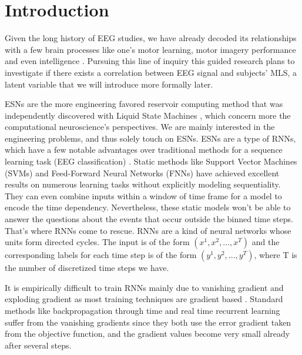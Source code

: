 \documentclass[a4paper,11pt,oneside]{article}
\begin{document}
\newpage
\tableofcontents

\clearpage
{}


\renewcommand{\nomname}{Abbreviations}
\printnomenclature[0.5in]
\clearpage

\section{Introduction}

Given the long history of EEG studies, we have already decoded its relationships with a few brain processes like one's motor learning, motor imagery performance and even intelligence \cite{zhang2015efficient} \cite{ozdenizci2016resting}\cite{Doppelmayr2002289}.  Pursuing this line of inquiry this guided research plans to investigate if there exists a correlation between EEG signal and subjects'  MLS, a latent variable that we will introduce more formally later.


ESNs \cite{jaeger2001echo} are the more engineering favored reservoir computing method that was
independently discovered with Liquid State Machines \cite{maass2002real}, which concern more the computational
neuroscience's perspectives. We are mainly interested in the engineering problems, and thus solely touch on ESNs.
ESNs are a type of RNNs, which have a few notable advantages over traditional methods
for a sequence learning task (EEG classification)  \cite{lipton2015critical}. Static methods like Support Vector 
Machines (SVMs) and  Feed-Forward Neural Networks (FNNs) 
   have 
achieved excellent results on numerous learning tasks without explicitly modeling sequentiality. They can even
combine inputs within a window of time frame for a model to encode the time dependency. Nevertheless, these static models won't be able to answer the questions about the events that occur outside the binned time steps. That's where RNNs come to rescue.
RNNs are a kind of neural networks whose units form directed cycles. The input is of the form $(x^1, x^2, \dots, x^T)$
and the corresponding labels for each time step is of the form $(y^1, y^2, \dots, y^T)$, where T is the number of discretized time steps we have. 

It is empirically difficult to train RNNs mainly due to vanishing gradient and exploding gradient as most training techniques 
are gradient based \cite{bengio1994learning}. Standard methods like backpropagation through time
and real time recurrent learning suffer from the vanishing gradients since they both  use the error gradient
taken from the objective function, and the gradient values become very small already after several steps.
\end{document}
